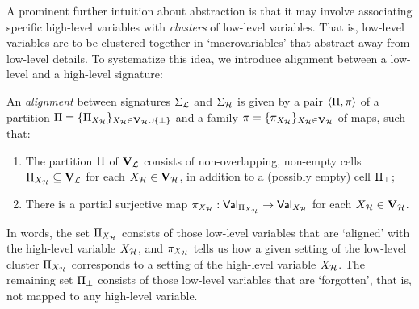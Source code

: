 \documentclass[twoside,11pt]{article}
\begin{document}
A prominent further intuition about abstraction is that it may involve associating specific high-level variables with \emph{clusters} of low-level variables. That is, low-level variables are to be clustered together in `macrovariables' that abstract away from low-level details. To systematize this idea, we introduce alignment between a low-level and a high-level signature:
\begin{definition}[Alignment] \label{def:alignment} 

An \emph{alignment} between signatures $\Sigma_{\mathcal{L}}$ and $\Sigma_{\mathcal{H}}$ is given by a pair $\langle \Pi,\pi\rangle$ of a partition $\Pi=\{\Pi_{X_{\mathcal{H}}}\}_{X_{\mathcal{H}} \in \mathbf{V}_{\mathcal{H}} \cup \{\bot \}}$ and a family $\pi= \{\pi_{X_{\mathcal{H}}}\}_{X_{\mathcal{H}} \in \mathbf{V}_{\mathcal{H}}}$ of maps, such that:
\begin{enumerate}
    \item The partition $\Pi$ of $\mathbf{V}_{\mathcal{L}}$ consists of non-overlapping, non-empty cells $\Pi_{X_{\mathcal{H}}} \subseteq \mathbf{V}_{\mathcal{L}}$ for each $X_{\mathcal{H}} \in \mathbf{V}_{\mathcal{H}}$, in addition to a (possibly empty) cell $\Pi_{\bot}$;
    \item There is a partial surjective map $\pi_{X_{\mathcal{H}}}:\mathsf{Val}_{\Pi_{X_{\mathcal{H}}}}\rightarrow\mathsf{Val}_{X_{\mathcal{H}}}$ for each $X_{\mathcal{H}} \in \mathbf{V}_{\mathcal{H}}$. 
\end{enumerate}
\end{definition}
In words, the set $\Pi_{X_{\mathcal{H}}}$ consists of those low-level variables that are `aligned' with the high-level variable $X_{\mathcal{H}}$, and $\pi_{X_{\mathcal{H}}}$ tells us how a given setting of the low-level cluster $\Pi_{X_{\mathcal{H}}}$ corresponds to a setting of the high-level variable $X_{\mathcal{H}}$. The remaining set $\Pi_\bot$ consists of those low-level variables that are `forgotten', that is, not mapped to any high-level variable.
\end{document}
